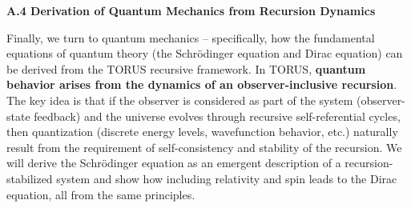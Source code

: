 \documentclass[
]{article}
\begin{document}
{\textbf{A.4 Derivation of Quantum Mechanics from Recursion Dynamics}

Finally, we turn to quantum mechanics -- specifically, how the
fundamental equations of quantum theory (the Schrödinger equation and
Dirac equation) can be derived from the TORUS recursive framework. In
TORUS, \textbf{quantum behavior arises from the dynamics of an
observer-inclusive recursion}. The key idea is that if the observer is
considered as part of the system (observer-state feedback) and the
universe evolves through recursive self-referential cycles, then
quantization (discrete energy levels, wavefunction behavior, etc.)
naturally result from the requirement of self-consistency and stability
of the recursion. We will derive the Schrödinger equation as an emergent
description of a recursion-stabilized system and show how including
relativity and spin leads to the Dirac equation, all from the same
principles.

}
\end{document}
